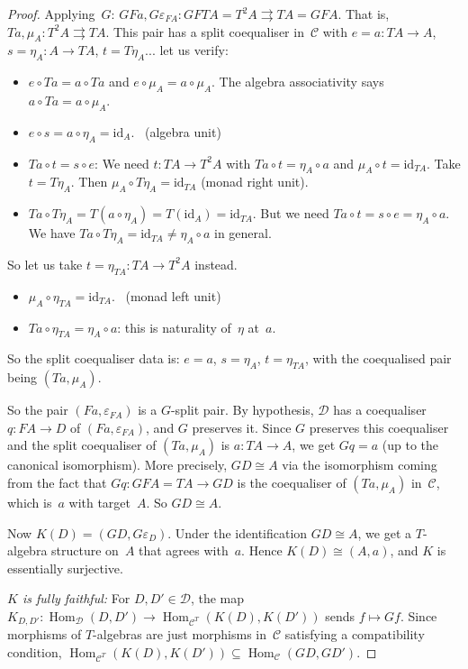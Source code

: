 \documentclass[a4paper,12pt]{book}
\DeclareMathOperator{\Hom}{Hom}
\newcommand{\id}{\mathrm{id}}
\theoremstyle{definition}
\theoremstyle{plain}
\theoremstyle{remark}
\begin{document}
\begin{proof}
Applying~$G$:
$GFa,G\varepsilon_{FA}\colon GFTA = T^2A\rightrightarrows TA = GFA$.
That is, $Ta,\mu_A\colon T^2A\rightrightarrows TA$.
This pair has a split coequaliser in~$\mathcal{C}$ with
$e = a\colon TA\to A$, $s = \eta_A\colon A\to TA$,
$t = T\eta_A... $ let us verify:
\begin{itemize}
\item $e\circ Ta = a\circ Ta$ and $e\circ\mu_A = a\circ\mu_A$.
    The algebra associativity says $a\circ Ta = a\circ\mu_A$. \checkmark
\item $e\circ s = a\circ\eta_A = \id_A$. \checkmark\ (algebra unit)
\item $Ta\circ t = s\circ e$: We need $t\colon TA\to T^2A$ with
    $Ta\circ t = \eta_A\circ a$ and $\mu_A\circ t = \id_{TA}$.
    Take $t = T\eta_A$.  Then $\mu_A\circ T\eta_A = \id_{TA}$
    (monad right unit). \checkmark
\item $Ta\circ T\eta_A = T(a\circ\eta_A) = T(\id_A) = \id_{TA}$.
    But we need $Ta\circ t = s\circ e = \eta_A\circ a$.
    We have $Ta\circ T\eta_A = \id_{TA}\neq\eta_A\circ a$ in general.
\end{itemize}

So let us take $t = \eta_{TA}\colon TA\to T^2A$ instead.
\begin{itemize}
\item $\mu_A\circ\eta_{TA} = \id_{TA}$. \checkmark\ (monad left unit)
\item $Ta\circ\eta_{TA} = \eta_A\circ a$: this is naturality of~$\eta$
    at~$a$. \checkmark
\end{itemize}
So the split coequaliser data is: $e = a$, $s = \eta_A$, $t = \eta_{TA}$,
with the coequalised pair being $(Ta,\mu_A)$.

So the pair $(Fa,\varepsilon_{FA})$ is a $G$-split pair.
By hypothesis, $\mathcal{D}$ has a coequaliser
$q\colon FA\to D$ of $(Fa,\varepsilon_{FA})$, and $G$ preserves it.
Since $G$ preserves this coequaliser and the split coequaliser of
$(Ta,\mu_A)$ is $a\colon TA\to A$, we get $Gq = a$ (up to the
canonical isomorphism).  More precisely, $GD\cong A$ via the
isomorphism coming from the fact that $Gq\colon GFA = TA\to GD$
is the coequaliser of $(Ta,\mu_A)$ in~$\mathcal{C}$, which is~$a$
with target~$A$.  So $GD\cong A$.

Now $K(D) = (GD, G\varepsilon_D)$.
Under the identification $GD\cong A$, we get a $T$-algebra structure
on~$A$ that agrees with~$a$.  Hence $K(D)\cong(A,a)$, and $K$ is
essentially surjective.

\emph{$K$ is fully faithful:}
For $D,D'\in\mathcal{D}$, the map
$K_{D,D'}\colon\Hom_{\mathcal{D}}(D,D')\to
\Hom_{\mathcal{C}^T}(K(D),K(D'))$
sends $f\mapsto Gf$.  Since morphisms of $T$-algebras are just
morphisms in~$\mathcal{C}$ satisfying a compatibility condition,
$\Hom_{\mathcal{C}^T}(K(D),K(D')) \subseteq \Hom_{\mathcal{C}}(GD,GD')$.


\end{proof}
\end{document}
